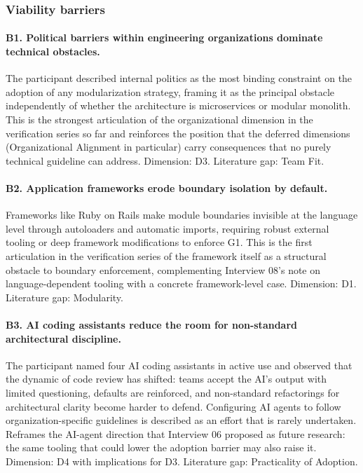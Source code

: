 \subsubsection*{Viability barriers}

\paragraph*{B1. Political barriers within engineering organizations dominate technical obstacles.} The participant described internal politics as the most binding constraint on the adoption of any modularization strategy, framing it as the principal obstacle independently of whether the architecture is microservices or modular monolith. This is the strongest articulation of the organizational dimension in the verification series so far and reinforces the position that the deferred dimensions (Organizational Alignment in particular) carry consequences that no purely technical guideline can address. Dimension: D3. Literature gap: Team Fit.

\paragraph*{B2. Application frameworks erode boundary isolation by default.} Frameworks like Ruby on Rails make module boundaries invisible at the language level through autoloaders and automatic imports, requiring robust external tooling or deep framework modifications to enforce G1. This is the first articulation in the verification series of the framework itself as a structural obstacle to boundary enforcement, complementing Interview 08's note on language-dependent tooling with a concrete framework-level case. Dimension: D1. Literature gap: Modularity.

\paragraph*{B3. AI coding assistants reduce the room for non-standard architectural discipline.} The participant named four AI coding assistants in active use and observed that the dynamic of code review has shifted: teams accept the AI's output with limited questioning, defaults are reinforced, and non-standard refactorings for architectural clarity become harder to defend. Configuring AI agents to follow organization-specific guidelines is described as an effort that is rarely undertaken. Reframes the AI-agent direction that Interview 06 proposed as future research: the same tooling that could lower the adoption barrier may also raise it. Dimension: D4 with implications for D3. Literature gap: Practicality of Adoption.

